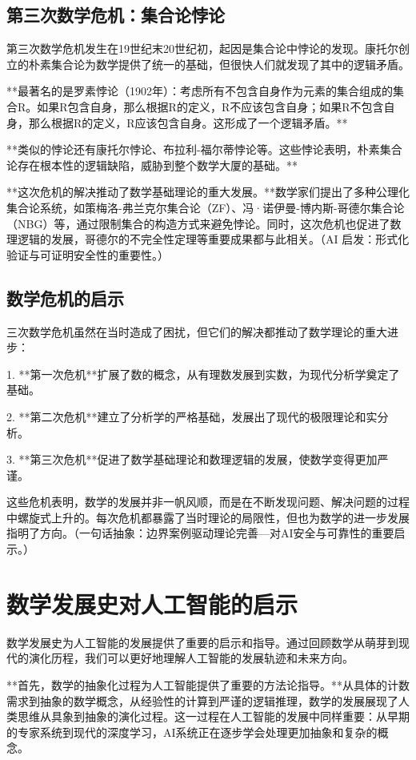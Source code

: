 \subsection{第三次数学危机：集合论悖论}

第三次数学危机发生在19世纪末20世纪初，起因是集合论中悖论的发现。康托尔创立的朴素集合论为数学提供了统一的基础，但很快人们就发现了其中的逻辑矛盾。

**最著名的是罗素悖论（1902年）：考虑所有不包含自身作为元素的集合组成的集合R。如果R包含自身，那么根据R的定义，R不应该包含自身；如果R不包含自身，那么根据R的定义，R应该包含自身。这形成了一个逻辑矛盾。**

**类似的悖论还有康托尔悖论、布拉利-福尔蒂悖论等。这些悖论表明，朴素集合论存在根本性的逻辑缺陷，威胁到整个数学大厦的基础。**

**这次危机的解决推动了数学基础理论的重大发展。**数学家们提出了多种公理化集合论系统，如策梅洛-弗兰克尔集合论（ZF）、冯·诺伊曼-博内斯-哥德尔集合论（NBG）等，通过限制集合的构造方式来避免悖论。同时，这次危机也促进了数理逻辑的发展，哥德尔的不完全性定理等重要成果都与此相关。{（AI 启发：形式化验证与可证明安全性的重要性。）}

\subsection{数学危机的启示}

三次数学危机虽然在当时造成了困扰，但它们的解决都推动了数学理论的重大进步：

1. **第一次危机**扩展了数的概念，从有理数发展到实数，为现代分析学奠定了基础。

2. **第二次危机**建立了分析学的严格基础，发展出了现代的极限理论和实分析。

3. **第三次危机**促进了数学基础理论和数理逻辑的发展，使数学变得更加严谨。

这些危机表明，数学的发展并非一帆风顺，而是在不断发现问题、解决问题的过程中螺旋式上升的。每次危机都暴露了当时理论的局限性，但也为数学的进一步发展指明了方向。{（一句话抽象：边界案例驱动理论完善—对AI安全与可靠性的重要启示。）}

\section{数学发展史对人工智能的启示}

数学发展史为人工智能的发展提供了重要的启示和指导。通过回顾数学从萌芽到现代的演化历程，我们可以更好地理解人工智能的发展轨迹和未来方向。

**首先，数学的抽象化过程为人工智能提供了重要的方法论指导。**从具体的计数需求到抽象的数学概念，从经验性的计算到严谨的逻辑推理，数学的发展展现了人类思维从具象到抽象的演化过程。这一过程在人工智能的发展中同样重要：从早期的专家系统到现代的深度学习，AI系统正在逐步学会处理更加抽象和复杂的概念。

